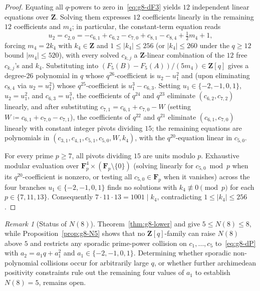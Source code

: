 \documentclass[11pt]{amsart}
\theoremstyle{remark}
\newtheorem{remark}[theorem]{Remark}
\newcommand{\F}{\mathbf{F}}
\newcommand{\Z}{\mathbf{Z}}
\begin{document}
\begin{proof}
Equating all $q$-powers to zero in~\eqref{eq:g8-dF3} yields $12$ independent linear equations over $\Z$. Solving them expresses $12$ coefficients linearly in the remaining $12$ coefficients and $m_4$; in particular, the constant-term equation reads
\[
u_2 = c_{2,0} = -c_{6,1} + c_{6,2} - c_{7,0} + c_{8,1} - c_{8,4} + \tfrac{1}{2} m_4 + 1,
\]
forcing $m_4 = 2 k_4$ with $k_4 \in \Z$ and $1 \le |k_4| \le 256$ (or $|k_4| \le 260$ under the $q \ge 12$ bound $|m_4| \le 520$), with every solved $c_{k,j}$ a $\Z$-linear combination of the $12$ free $c_{k,j}$'s and $k_4$. Substituting into $(F_5(B) - F_5(A))/(5 m_4) \in \Z[q]$ gives a degree-$26$ polynomial in $q$ whose $q^{26}$-coefficient is $u_2 - u_1^2$ and (upon eliminating $c_{8,4}$ via $u_2 = u_1^2$) whose $q^{25}$-coefficient is $u_1^3 - c_{6,3}$. Setting $u_1 \in \{-2, -1, 0, 1\}$, $u_2 = u_1^2$, and $c_{6,3} = u_1^3$, the coefficients of $q^{24}$ and $q^{23}$ eliminate $(c_{6,2}, c_{7,2})$ linearly, and after substituting $c_{7,1} = c_{6,1} + c_{7,0} - W$ (setting $W \coloneqq c_{6,1} + c_{7,0} - c_{7,1}$), the coefficients of $q^{22}$ and $q^{21}$ eliminate $(c_{6,1}, c_{7,0})$ linearly with constant integer pivots dividing $15$; the remaining equations are polynomials in $(c_{3,1}, c_{4,1}, c_{5,1}, c_{5,0}, W, k_4)$, with the $q^{20}$-equation linear in $c_{5,0}$.

For every prime $p \ge 7$, all pivots dividing $15$ are units modulo $p$. Exhaustive modular evaluation over $\F_p^4 \times (\F_p \setminus \{0\})$ (solving linearly for $c_{5,0} \bmod p$ when its $q^{20}$-coefficient is nonzero, or testing all $c_{5,0} \in \F_p$ when it vanishes) across the four branches $u_1 \in \{-2, -1, 0, 1\}$ finds no solutions with $k_4 \not\equiv 0 \pmod{p}$ for each $p \in \{7, 11, 13\}$. Consequently $7 \cdot 11 \cdot 13 = 1001 \mid k_4$, contradicting $1 \le |k_4| \le 256$.
\end{proof}

\begin{remark}[Status of $N(8)$]\label{rem:N8-open}
Theorem~\ref{thm:g8-lower} and \cite[Theorem~1.1]{CK26} give $5 \le N(8) \le 8$, while Proposition~\ref{prop:g8-N5} shows that no $\Z[q]$-family can raise $N(8)$ above $5$ and restricts any sporadic prime-power collision on $c_1, \dots, c_5$ to~\eqref{eq:g8-dP} with $a_2 = a_1 q + a_1^2$ and $a_1 \in \{-2, -1, 0, 1\}$. Determining whether sporadic non-polynomial collisions occur for arbitrarily large $q$, or whether further archimedean positivity constraints rule out the remaining four values of $a_1$ to establish $N(8) = 5$, remains open.
\end{remark}
\end{document}
